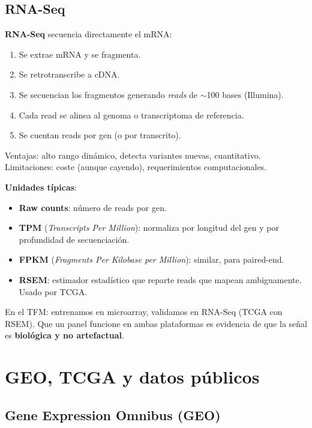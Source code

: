 \documentclass[11pt, a4paper]{article}
\begin{document}
\subsection{RNA-Seq}

\textbf{RNA-Seq} secuencia directamente el mRNA:

\begin{enumerate}[leftmargin=1.4em]
  \item Se extrae mRNA y se fragmenta.
  \item Se retrotranscribe a cDNA.
  \item Se secuencian los fragmentos generando \emph{reads} de $\sim$100
  bases (Illumina).
  \item Cada read se alinea al genoma o transcriptoma de referencia.
  \item Se cuentan reads por gen (o por transcrito).
\end{enumerate}

Ventajas: alto rango din\'amico, detecta variantes nuevas, cuantitativo.
Limitaciones: coste (aunque cayendo), requerimientos computacionales.

\textbf{Unidades t\'ipicas}:
\begin{itemize}[leftmargin=1.2em]
  \item \textbf{Raw counts}: n\'umero de reads por gen.
  \item \textbf{TPM} (\emph{Transcripts Per Million}): normaliza por longitud del gen y por profundidad de secuenciaci\'on.
  \item \textbf{FPKM} (\emph{Fragments Per Kilobase per Million}): similar, para paired-end.
  \item \textbf{RSEM}: estimador estad\'istico que reparte reads que mapean ambiguamente. Usado por TCGA.
\end{itemize}

En el TFM: entrenamos en microarray, validamos en RNA-Seq (TCGA con RSEM).
Que un panel funcione en ambas plataformas es evidencia de que la se\~nal
es \textbf{biol\'ogica y no artefactual}.

\section{GEO, TCGA y datos p\'ublicos}

\subsection{Gene Expression Omnibus (GEO)}
\end{document}
